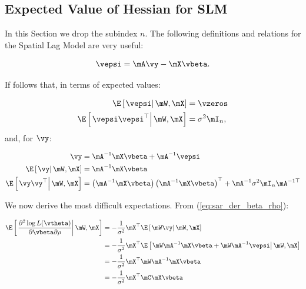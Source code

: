 \documentclass[english,12pt]{book}\usepackage[]{graphicx}\usepackage[]{xcolor}
\begin{document}
\begin{subappendices}

 \section{Expected Value of Hessian for SLM}\label{appendix-EH-sml}




In this Section we drop the subindex $n$. The following definitions and relations for the Spatial Lag Model are very useful:

\begin{equation*}
	\vepsi  =  \mA\vy - \mX\vbeta. 
\end{equation*}

If follows that, in terms of expected values:

\begin{align}
	\E\left[\left.\vepsi\right|\mW, \mX\right] &= \vzeros \\
	\E\left[\left.\vepsi\vepsi^\top\right|\mW, \mX\right] &= \sigma^2\mI_n,
\end{align}
%
and, for $\vy$:

\begin{align}
	\vy & =  \mA^{-1}\mX\vbeta + \mA^{-1}\vepsi \\
	\E\left[\left.\vy\right|\mW, \mX\right]   & =  \mA^{-1}\mX\vbeta \\
	\E\left[\left.\vy\vy^\top\right|\mW, \mX\right] & =  \left(\mA^{-1}\mX\vbeta\right) \left(\mA^{-1}\mX\vbeta\right)^\top + \mA^{-1}\sigma^2\mI_n\mA^{-1\top}
\end{align}

We now derive the most difficult expectations. From (\ref{eq:sar_der_beta_rho}):

\begin{equation}\label{eq:E_der_beta_rho}
\begin{aligned}
\E\left[\left.\frac{\partial^2  \log L(\vtheta)}{\partial \vbeta \partial \rho} \right|\mW, \mX\right] & = - \frac{1}{\sigma^2} \mX^\top\E\left[\left.\mW\vy\right| \mW, \mX\right] \\
& = - \frac{1}{\sigma^2} \mX^\top\E\left[\left.\mW\mA^{-1}\mX\vbeta + \mW\mA^{-1}\vepsi\right| \mW, \mX\right] \\
& = - \frac{1}{\sigma^2} \mX^\top\mW\mA^{-1}\mX\vbeta \\
& = - \frac{1}{\sigma^2} \mX^\top\mC\mX\vbeta
\end{aligned}	
\end{equation}



\end{subappendices}
\end{document}
